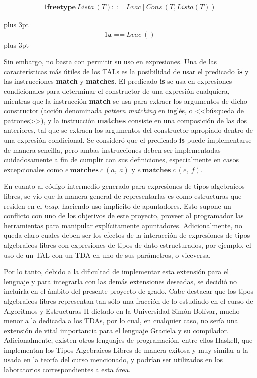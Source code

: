 {{\setcounter{equation}{1}
\begin{alignat}{1}
\textbf{freetype}\ Lista\ (T) ::= Lvac\ |\ Cons\ (T, Lista (T)) \label{fig:freetype}
\end{alignat}

\abovedisplayskip=-18pt plus 3pt %
\begin{alignat}{1}
\texttt{a ==}\  Lvac\ () \label{fig:lvac}
\end{alignat}
\abovedisplayskip=-6pt plus 3pt %

Sin embargo, no basta con permitir su uso en expresiones. Una de las
características más útiles de los TALs es la posibilidad de usar el predicado
\textbf{is} y las instrucciones \textbf{match} y \textbf{matches}. El predicado
\textbf{is} se usa en expresiones condicionales para determinar el constructor
de una expresión cualquiera, mientras que la instrucción \textbf{match} se usa
para extraer los argumentos de dicho constructor (acción denominada
\textit{pattern matching} en inglés, o <<búsqueda de patrones>>), y la instrucción
\textbf{matches} consiste en una composición de las dos anteriores, tal que se
extraen los argumentos del constructor apropiado dentro de una expresión
condicional. Se consideró que el predicado \textbf{is} puede implementarse de
manera sencilla, pero ambas instrucciones deben ser implementadas cuidadosamente
a fin de cumplir con sus definiciones, especialmente en casos excepcionales como
$e\ \textbf{matches}\ c\ (a,\ a)$ y $e\ \textbf{matches}\ c\ (e,\ f)$.

En cuanto al código intermedio generado para expresiones de tipos algebraicos
libres, se vio que la manera general de representarlas es como estructuras que
residen en el \textit{heap}, haciendo uso implícito de apuntadores. Esto supone un
conflicto con uno de los objetivos de este proyecto, proveer al programador las
herramientas para manipular explícitamente apuntadores. Adicionalmente, no queda
claro cuales deben ser los efectos de la interacción de expresiones de tipos
algebraicos libres con expresiones de tipos de dato estructurados, por ejemplo,
el uso de un TAL con un TDA en uno de sus parámetros, o viceversa.

Por lo tanto, debido a la dificultad de implementar esta extensión para el
lenguaje y para integrarla con las demás extensiones deseadas, se decidió no
incluirla en el ámbito del presente proyecto de grado. Cabe destacar que los
tipos algebraicos libres representan tan sólo una fracción de lo estudiado en el
curso de Algoritmos y Estructuras II dictado en la Universidad Simón Bolívar,
mucho menor a la dedicada a los TDAs, por lo cual, en cualquier caso, no sería
una extensión de vital importancia para el lenguaje Graciela y su compilador.
Adicionalmente, existen otros lenguajes de programación, entre ellos Haskell,
que implementan los Tipos Algebraicos Libres de manera exitosa y muy similar a
la usada en la teoría del curso mencionado, y podrían ser utilizados en los
laboratorios correspondientes a esta área.

}}
